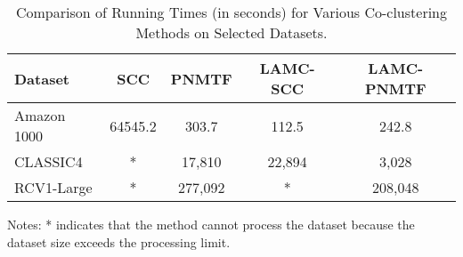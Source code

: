 \begin{table*}[!htbp]
    \centering
    \caption{Comparison of Running Times (in seconds) for Various Co-clustering Methods on Selected Datasets.}
    \label{tab:running-time}
    \begin{tabular}{@{} l cccc @{}}
        \toprule
        Dataset     & SCC \cite{dhillon2001CoclusteringDocumentsWords} & PNMTF \cite{chen2023ParallelNonNegativeMatrix} & \textbf{LAMC-SCC} & \textbf{LAMC-PNMTF} \\
        \midrule
        Amazon 1000 & 64545.2                                          & 303.7                                          & 112.5             & 242.8               \\
        CLASSIC4    & *                                                & 17,810                                         & 22,894            & 3,028               \\
        RCV1-Large  & *                                                & 277,092                                        & *                 & 208,048             \\
        \bottomrule
    \end{tabular}
    \begin{tablenotes}
        \small
        \item Notes: * indicates that the method cannot process the dataset because the dataset size exceeds the processing limit.
    \end{tablenotes}
\end{table*}

